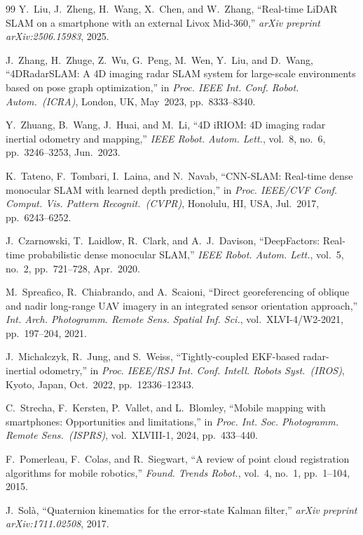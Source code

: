 \begin{thebibliography}{99}
Y.~Liu, J.~Zheng, H.~Wang, X.~Chen, and W.~Zhang,
``Real-time LiDAR SLAM on a smartphone with an external Livox Mid-360,''
\textit{arXiv preprint arXiv:2506.15983}, 2025.

J.~Zhang, H.~Zhuge, Z.~Wu, G.~Peng, M.~Wen, Y.~Liu, and D.~Wang,
``4DRadarSLAM: A 4D imaging radar SLAM system for large-scale environments based on pose graph optimization,''
in \textit{Proc. IEEE Int. Conf. Robot. Autom.\ (ICRA)}, London, UK, May~2023, pp.~8333--8340.

Y.~Zhuang, B.~Wang, J.~Huai, and M.~Li,
``4D iRIOM: 4D imaging radar inertial odometry and mapping,''
\textit{IEEE Robot. Autom. Lett.}, vol.~8, no.~6, pp.~3246--3253, Jun.~2023.

K.~Tateno, F.~Tombari, I.~Laina, and N.~Navab,
``CNN-SLAM: Real-time dense monocular SLAM with learned depth prediction,''
in \textit{Proc. IEEE/CVF Conf. Comput. Vis. Pattern Recognit.\ (CVPR)}, Honolulu, HI, USA, Jul.~2017, pp.~6243--6252.

J.~Czarnowski, T.~Laidlow, R.~Clark, and A.~J.~Davison,
``DeepFactors: Real-time probabilistic dense monocular SLAM,''
\textit{IEEE Robot. Autom. Lett.}, vol.~5, no.~2, pp.~721--728, Apr.~2020.

M.~Spreafico, R.~Chiabrando, and A.~Scaioni,
``Direct georeferencing of oblique and nadir long-range UAV imagery in an integrated sensor orientation approach,''
\textit{Int. Arch. Photogramm. Remote Sens. Spatial Inf. Sci.}, vol.~XLVI-4/W2-2021, pp.~197--204, 2021.

J.~Michalczyk, R.~Jung, and S.~Weiss,
``Tightly-coupled EKF-based radar-inertial odometry,''
in \textit{Proc. IEEE/RSJ Int. Conf. Intell. Robots Syst.\ (IROS)}, Kyoto, Japan, Oct.~2022, pp.~12336--12343.

C.~Strecha, F.~Kersten, P.~Vallet, and L.~Blomley,
``Mobile mapping with smartphones: Opportunities and limitations,''
in \textit{Proc. Int. Soc. Photogramm. Remote Sens.\ (ISPRS)}, vol.~XLVIII-1, 2024, pp.~433--440.

F.~Pomerleau, F.~Colas, and R.~Siegwart,
``A review of point cloud registration algorithms for mobile robotics,''
\textit{Found. Trends Robot.}, vol.~4, no.~1, pp.~1--104, 2015.

J.~Sol\`{a},
``Quaternion kinematics for the error-state Kalman filter,''
\textit{arXiv preprint arXiv:1711.02508}, 2017.


\end{thebibliography}
